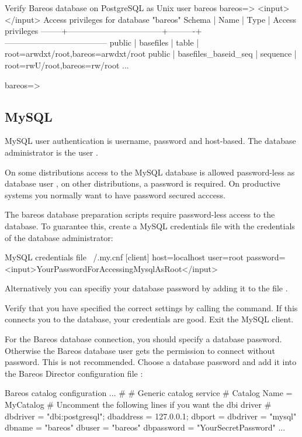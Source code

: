 \begin{commands}{Verify Bareos database on PostgreSQL as Unix user bareos}
bareos=> <input>\dp</input>
                 Access privileges for database "bareos"
 Schema |               Name                |   Type   |  Access privileges
--------+-----------------------------------+----------+--------------------------------------
 public | basefiles                         | table    | {root=arwdxt/root,bareos=arwdxt/root}
 public | basefiles_baseid_seq              | sequence | {root=rwU/root,bareos=rw/root}
...

bareos=>
\end{commands}


\subsection{MySQL}
\label{catalog-maintenance-mysql}

MySQL user authentication is username, password and host-based.
The database administrator is the user .

On some distributions access to the MySQL database is allowed password-less as database user ,
on other distributions, a password is required.
On productive systems you normally want to have password secured acccess.

The bareos database preparation scripts require password-less access to the database.
To guarantee this, create a MySQL credentials file  with the credentials of the database administrator:
\begin{config}{MySQL credentials file ~/.my.cnf}
[client]
host=localhost
user=root
password=<input>YourPasswordForAccessingMysqlAsRoot</input>
\end{config}
Alternatively you can specifiy your database password by adding it to the file .

Verify that you have specified the correct settings by calling the  command.
If this connects you to the database, your credentials are good.
Exit the MySQL client.

For the Bareos database connection, you should specify a database password. 
Otherwise the Bareos database user gets the permission to connect without password.
This is not recommended.
Choose a database password and add it into the Bareos Director configuration file \configFileDirUnix:
\begin{bconfig}{Bareos catalog configuration}
...
#
# Generic catalog service
#
Catalog {
  Name = MyCatalog
  # Uncomment the following lines if you want the dbi driver
  # dbdriver = "dbi:postgresql"; dbaddress = 127.0.0.1; dbport =  
  dbdriver = "mysql"
  dbname = "bareos"
  dbuser = "bareos"
  dbpassword = "YourSecretPassword"
}
...
\end{bconfig}

